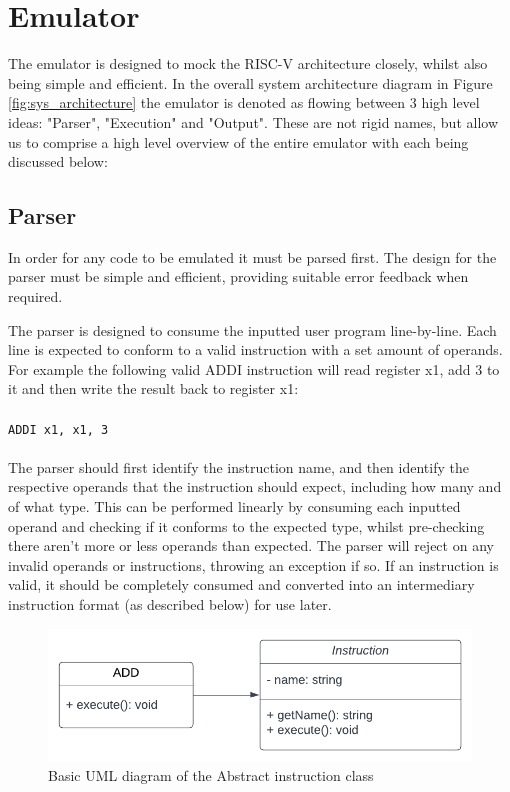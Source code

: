 \section{Emulator}\label{sec:emulator}
The emulator is designed to mock the RISC-V architecture closely, whilst also being simple and efficient. In the overall system architecture diagram in Figure \ref{fig:sys_architecture} the emulator is denoted as flowing between 3 high level ideas: "Parser", "Execution" and "Output". These are not rigid names, but allow us to comprise a high level overview of the entire emulator with each being discussed below:

\subsection{Parser}\label{sec:parser}
In order for any code to be emulated it must be parsed first. The design for the parser must be simple and efficient, providing suitable error feedback when required.

The parser is designed to consume the inputted user program line-by-line. Each line is expected to conform to a valid instruction with a set amount of operands. For example the following valid ADDI instruction will read register x1, add 3 to it and then write the result back to register x1:\\\\
\verb|ADDI x1, x1, 3|
\\\\
The parser should first identify the instruction name, and then identify the respective operands that the instruction should expect, including how many and of what type. This can be performed linearly by consuming each inputted operand and checking if it conforms to the expected type, whilst pre-checking there aren't more or less operands than expected. The parser will reject on any invalid operands or instructions, throwing an exception if so. If an instruction is valid, it should be completely consumed and converted into an intermediary instruction format (as described below) for use later.

\begin{figure}[H]
    \centering
    \includegraphics[width=0.95\linewidth]{dissertation/DATA/instr_abstract_uml.png}
    \caption{Basic UML diagram of the Abstract instruction class}
    \label{fig:instr_abstract_uml}
\end{figure}

